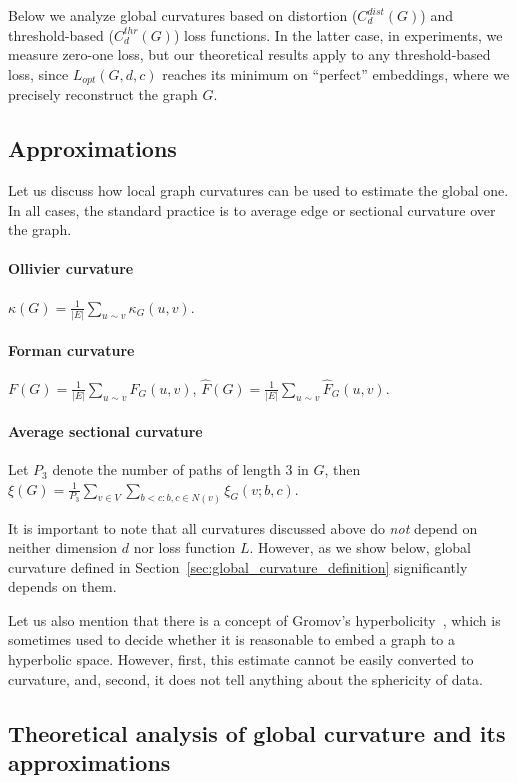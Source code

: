 \documentclass{article} %
\begin{document}
Below we analyze global curvatures based on distortion ($C_d^{dist}(G)$) and threshold-based ($C_d^{thr}(G)$) loss functions. 
In the latter case, in experiments, we measure zero-one loss, but our theoretical results apply to any threshold-based loss, since 
$L_{opt}(G,d,c)$ reaches its minimum on ``perfect'' embeddings, where we precisely reconstruct the graph $G$.

\subsection{Approximations}

Let us discuss how local graph curvatures can be used to estimate the global one. In all cases, the standard practice is to average edge or sectional curvature over the graph.

\paragraph{Ollivier curvature} $\kappa(G) = \frac{1}{|E|}\sum\limits_{u\sim v} \kappa_G(u,v)$.

\paragraph{Forman curvature} $F(G) = \frac{1}{|E|}\sum\limits_{u\sim v} F_G(u,v)$, $\hat F(G) = \frac{1}{|E|}\sum\limits_{u\sim v} \hat F_G(u,v)$.

\paragraph{Average sectional curvature} Let $P_3$ denote the number of paths of length 3 in $G$, then $\xi(G) = \frac{1}{P_3} \sum\limits_{v \in V }\sum\limits_{b<c: b,c\in N(v)} \xi_G(v;b,c)$.

It is important to note that all curvatures discussed above do \textit{not} depend on neither dimension $d$ nor loss function $L$. However, as we show below, global curvature defined in Section~\ref{sec:global_curvature_definition} significantly depends on them.

Let us also mention that there is a concept of Gromov's hyperbolicity~\citep{gromov1987hyperbolic}, which is sometimes used to decide whether it is reasonable to embed a graph to a hyperbolic space. However, first, this estimate cannot be easily converted to curvature, and, second, it does not tell anything about the sphericity of data.

\subsection{Theoretical analysis of global curvature and its approximations}\label{sec:theory}
\end{document}
